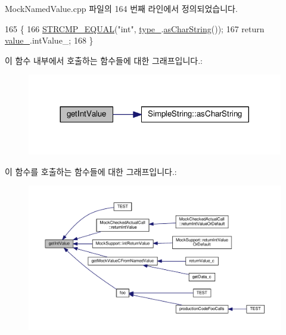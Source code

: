 Mock\+Named\+Value.\+cpp 파일의 164 번째 라인에서 정의되었습니다.


\begin{DoxyCode}
165 \{
166     \hyperlink{_utest_macros_8h_ade1dda09c948fee9ceb853bc6dd5f3cb}{STRCMP\_EQUAL}(\textcolor{stringliteral}{"int"}, \hyperlink{class_mock_named_value_ad41f1c1c681fbfc6ba0ef62ac34ac075}{type\_}.\hyperlink{class_simple_string_af7c0efaf31f42553f05719903c830be1}{asCharString}());
167     \textcolor{keywordflow}{return} \hyperlink{class_mock_named_value_a68986aee29946116b59c6189c19733ac}{value\_}.intValue\_;
168 \}
\end{DoxyCode}


이 함수 내부에서 호출하는 함수들에 대한 그래프입니다.\+:
\nopagebreak
\begin{figure}[H]
\begin{center}
\leavevmode
\includegraphics[width=317pt]{class_mock_named_value_abd16164fc39269075bdbbdae82fcc330_cgraph}
\end{center}
\end{figure}




이 함수를 호출하는 함수들에 대한 그래프입니다.\+:
\nopagebreak
\begin{figure}[H]
\begin{center}
\leavevmode
\includegraphics[width=350pt]{class_mock_named_value_abd16164fc39269075bdbbdae82fcc330_icgraph}
\end{center}
\end{figure}



